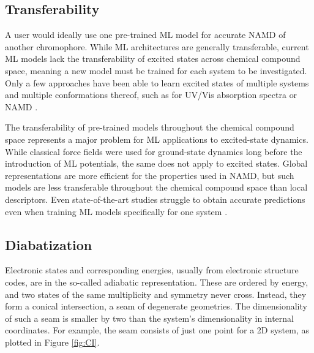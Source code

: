 \documentclass[9pt,bestpractices]{livecoms}
\begin{document}
\subsection{Transferability}
\label{sec:transferability}
A user would ideally use one pre-trained ML model for accurate NAMD of another chromophore. While ML architectures are generally transferable, current ML models lack the transferability of excited states across chemical compound space, meaning a new model must be trained for each system to be investigated. Only a few approaches have been able to learn excited states of multiple systems and multiple conformations thereof, such as for UV/Vis absorption spectra \cite{RN106} or NAMD \cite{RN100}.

The transferability of pre-trained models throughout the chemical compound space represents a major problem for ML applications to excited-state dynamics. While classical force fields were used for ground-state dynamics long before the introduction of ML potentials, the same does not apply to excited states. Global representations are more efficient for the properties used in NAMD, but such models are less transferable throughout the chemical compound space than local descriptors. Even state-of-the-art studies struggle to obtain accurate predictions even when training ML models specifically for one system \cite{RN105}.

\subsection{Diabatization}
\label{sec:diabatization}

Electronic states and corresponding energies, usually from electronic structure codes, are in the so-called adiabatic representation. These are ordered by energy, and two states of the same multiplicity and symmetry never cross. Instead, they form a conical intersection, a seam of degenerate geometries. The dimensionality of such a seam is smaller by two than the system's dimensionality in internal coordinates. For example, the seam consists of just one point for a 2D system, as plotted in Figure \ref{fig:CI}.
\end{document}
